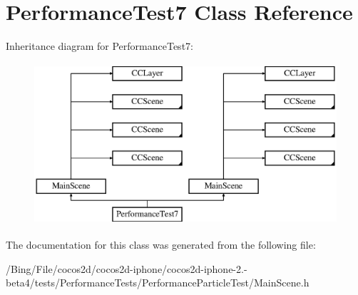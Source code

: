 \hypertarget{interface_performance_test7}{\section{Performance\-Test7 Class Reference}
\label{interface_performance_test7}
}
Inheritance diagram for Performance\-Test7\-:\begin{figure}[H]
\begin{center}
\leavevmode
\includegraphics[height=6.000000cm]{interface_performance_test7}
\end{center}
\end{figure}


The documentation for this class was generated from the following file\-:\begin{DoxyCompactItemize}
\item 
/\-Bing/\-File/cocos2d/cocos2d-\/iphone/cocos2d-\/iphone-\/2.-\/beta4/tests/\-Performance\-Tests/\-Performance\-Particle\-Test/Main\-Scene.\-h\end{DoxyCompactItemize}
